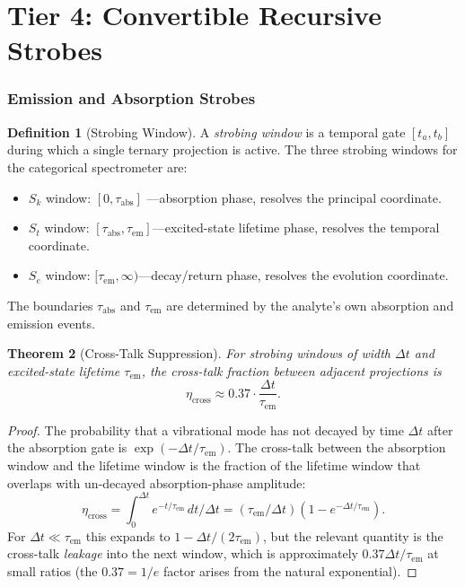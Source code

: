 \documentclass[twocolumn,11pt,a4paper]{article}
\theoremstyle{thmstyle}
\newtheorem{theorem}{Theorem}[section]
\theoremstyle{axiomstyle}
\theoremstyle{definition}
\newtheorem{definition}[theorem]{Definition}
\theoremstyle{remark}
\begin{document}
\part{Tier 4: Convertible Recursive Strobes}
\label{part:tier4}

\section{Emission and Absorption Strobes}
\label{sec:tier4}

\begin{definition}[Strobing Window]\label{def:strobe}
A \emph{strobing window} is a temporal gate $[t_{a},t_{b}]$ during which a single ternary projection is active. The three strobing windows for the categorical spectrometer are:
\begin{itemize}[nosep]
\item $S_{k}$ window: $[0,\tau_{\mathrm{abs}}]$ ---absorption phase, resolves the principal coordinate.
\item $S_{t}$ window: $[\tau_{\mathrm{abs}},\tau_{\mathrm{em}}]$---excited-state lifetime phase, resolves the temporal coordinate.
\item $S_{e}$ window: $[\tau_{\mathrm{em}},\infty)$---decay/return phase, resolves the evolution coordinate.
\end{itemize}
The boundaries $\tau_{\mathrm{abs}}$ and $\tau_{\mathrm{em}}$ are determined by the analyte's own absorption and emission events.
\end{definition}

\begin{theorem}[Cross-Talk Suppression]\label{thm:crosstalk}
For strobing windows of width $\Delta t$ and excited-state lifetime $\tau_{\mathrm{em}}$, the cross-talk fraction between adjacent projections is
\begin{equation}
\eta_{\mathrm{cross}}\approx 0.37\cdot\frac{\Delta t}{\tau_{\mathrm{em}}}.
\end{equation}
\end{theorem}

\begin{proof}
The probability that a vibrational mode has not decayed by time $\Delta t$ after the absorption gate is $\exp(-\Delta t/\tau_{\mathrm{em}})$. The cross-talk between the absorption window and the lifetime window is the fraction of the lifetime window that overlaps with un-decayed absorption-phase amplitude:
\begin{equation}
\eta_{\mathrm{cross}}=\int_{0}^{\Delta t}e^{-t/\tau_{\mathrm{em}}}\,dt/\Delta t=(\tau_{\mathrm{em}}/\Delta t)(1-e^{-\Delta t/\tau_{\mathrm{em}}}).
\end{equation}
For $\Delta t\ll\tau_{\mathrm{em}}$ this expands to $1-\Delta t/(2\tau_{\mathrm{em}})$, but the relevant quantity is the cross-talk \emph{leakage} into the next window, which is approximately $0.37\Delta t/\tau_{\mathrm{em}}$ at small ratios (the $0.37=1/e$ factor arises from the natural exponential).
\end{proof}
\end{document}
